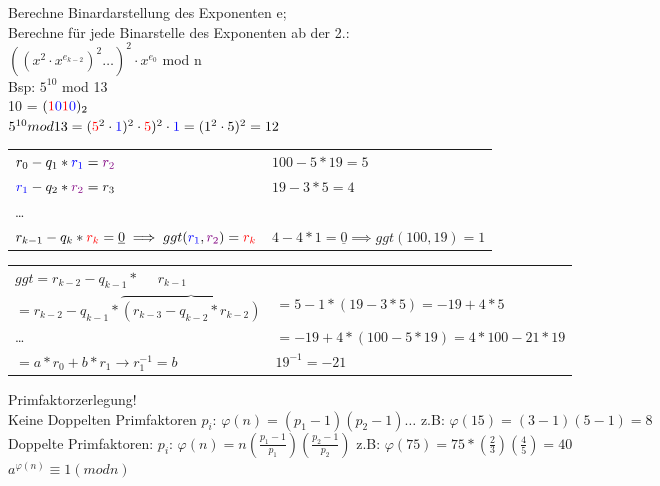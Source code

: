 Berechne Binardarstellung des Exponenten e;  \\
Berechne für jede Binarstelle des Exponenten ab der 2.:\\
$( (x^2 \cdot x^{e_{k-2}})^2 \dots )^2 \cdot x^{e_0}$ mod n\\

Bsp: $5^{10}$ mod 13\\
\newcommand{\I}{\textcolor{red}{1}}
\newcommand{\zero}{\textcolor{blue}{0}}
10 = $(\I\zero\I\zero)_2$		\\
$5^{10} mod 13 = (\textcolor{red}{5}^2 \cdot \textcolor{blue}{1})^2 \cdot \textcolor{red}{5})^2 \cdot \textcolor{blue}{1} = (1^2  \cdot 5)^2  = 12$




\minisec{\Euklid}
\newcommand{\rone}{\textcolor{blue}{r_1}}
\newcommand{\rto}{\textcolor{violet}{r_2}}
\newcommand{\rk}{\textcolor{red}{r_k}}
\begin {tabular}{ll}
$r_0 - q_1 * \rone = \rto		$	&	$	100 - 5 * 19 = 5$\\
$\rone - q_2 * \rto = r_3		$	&	$	19 - 3 * 5 = 4	$\\
\dots							&  	\textcolor{green!50!olive!50}{\Ovalbox{$	5 - 1*4	= 1$}} \\
$r_{k-1} - q_k * \rk = \underline{0}\implies ggt(\rone,\rto)= \rk	$ &	  $4 - 4*1 = \underline{0} \implies ggt(100,19)=1$   \\
\end{tabular}
\begin {tabular}{ll}
$ggt = r_{k-2} - q_{k-1} * ~~~~~~r_{k-1}				$		&	\textcolor{green!50!olive!50}{\Ovalbox{$1= 5-1*4$}\\
$= r_{k-2} - q_{k-1}* \overbrace{( r_{k-3} - q_{k-2} * r_{k-2})}$	&	$ = 5-1*(19 - 3 * 5)= - 19 +4 * 5$\\
			\dots								&		$ = -19 + 4* (100 - 5 * 19) = 4*100 -21 * 19 $\\
$	= a* r_0 +b * r_1  \rightarrow r_1^{-1} = b$ &$ 	19^{-1} = -21							$\\
\end{tabular}


 

Primfaktorzerlegung!\\
Keine Doppelten Primfaktoren $p_i$: $\varphi(n) = (p_1-1)(p_2-1)\dots $ z.B:  $\varphi(15) = (3-1)(5-1)=8$\\
Doppelte Primfaktoren: $p_i$: $\varphi(n) = n(\frac{p_1-1}{p_1})(\frac{p_2-1}{p_2})$ z.B: $\varphi(75) = 75*(\frac{2}{3})(\frac{4}{5}) = 40$\\
$a^{\varphi(n)}\equiv 1 (mod n)$


